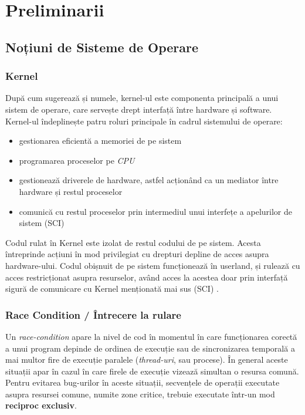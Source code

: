 \chapter{Preliminarii}

\section{Noțiuni de Sisteme de Operare}

\subsection{Kernel}

După cum sugerează și numele, kernel-ul este componenta principală a unui
sistem de operare, care servește drept interfață între hardware și software.
Kernel-ul îndeplinește patru roluri principale în cadrul sistemului de operare:

\begin{itemize}
  \setlength\itemsep{0em}
  \item gestionarea eficientă a memoriei de pe sistem
  \item programarea proceselor pe \emph{CPU}
  \item gestionează driverele de hardware, astfel acționând ca un mediator între
    hardware și restul proceselor
  \item comunică cu restul proceselor prin intermediul unui interfețe a
    apelurilor de sistem (SCI)
\end{itemize}

Codul rulat în Kernel este izolat de restul codului de pe sistem. Acesta
întreprinde acțiuni în mod privilegiat cu drepturi depline de acces asupra
hardware-ului. Codul obișnuit de pe sistem funcționează în userland, și rulează
cu acces restricționat asupra resurselor, având acces la acestea doar prin
interfață sigură de comunicare cu Kernel menționată mai sus (SCI)
\cite{kernel_redhat}.

\subsection{Race Condition / Întrecere la rulare}

Un \emph{race-condition} apare la nivel de cod în momentul în care funcționarea
corectă a unui program depinde de ordinea de execuție sau de sincronizarea
temporală a mai multor fire de execuție paralele (\emph{thread-uri}, sau
procese). În general aceste situații apar în cazul în care firele de execuție
vizează simultan o resursa comună. Pentru evitarea bug-urilor în aceste
situații, secvențele de operații executate asupra resursei comune, numite
zone critice, trebuie executate într-un mod \textbf{reciproc exclusiv}.

